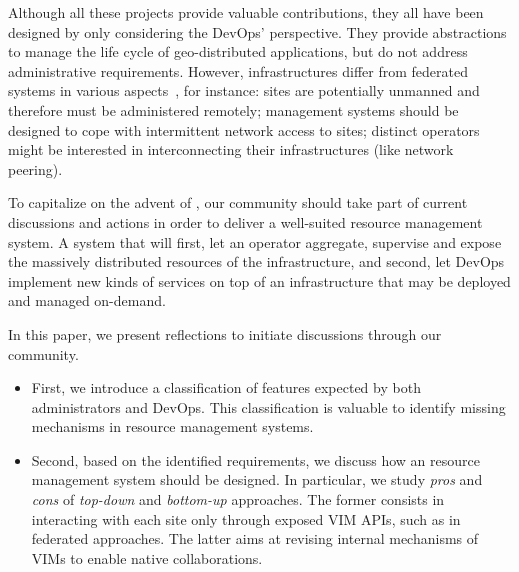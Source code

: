Although all these projects provide valuable contributions, they all have
been designed by only considering the DevOps' perspective. They provide
abstractions to manage the life cycle of geo-distributed applications,
but do not address administrative requirements.
%
However, \edgecomputing infrastructures differ from federated \cloud systems
in various aspects~\cite{openstack:whitepaper}, for instance:
\edge sites are potentially unmanned and therefore must be administered remotely;
management systems should be designed to cope with intermittent network access to sites; distinct operators might be interested in interconnecting their infrastructures (like network peering).
%

To capitalize on the advent of \edgecomputing, our community should take part
of current discussions and actions in order to deliver a well-suited
resource management system. A system that will first, let an operator aggregate, supervise and expose the massively distributed resources of the infrastructure,
and second, let DevOps implement new kinds of services on top of an infrastructure that may be deployed and managed on-demand.


In this paper, we present reflections to initiate discussions through our community.

\begin{itemize}[noitemsep, topsep=0pt]
\item First, we introduce a classification of features expected by 
  both administrators and DevOps. This classification is valuable to
  identify missing mechanisms in resource management systems.
\item Second, based on the identified requirements, we discuss
  how an \edge resource management system
  should be designed. In particular, we study \emph{pros} and
  \emph{cons} of \emph{top-down} and \emph{bottom-up} approaches. The
  former consists in interacting with each site only through
  exposed VIM APIs, such as in federated approaches. The
  latter aims at revising internal mechanisms of VIMs to enable native
  collaborations.
  \end{itemize}

